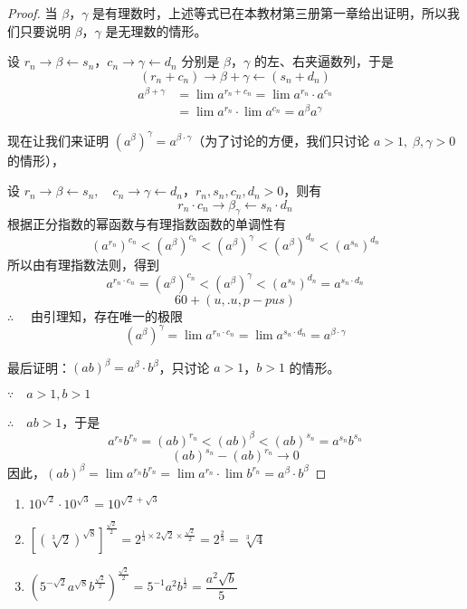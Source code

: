\begin{proof}
当 $\beta$，$\gamma$ 是有理数时，上述等式已在本教材第三册第一章给出证明，所以我们只要说明 $\beta$，$\gamma$ 是无理数的情形。

设 $r_n\to\beta\leftarrow s_n$，$c_n\to\gamma\leftarrow d_n$ 分别是 $\beta$，$\gamma$ 的左、右夹逼数列，于是
\[(r_n+c_n)\to \beta+\gamma \leftarrow (s_n+d_n)\]
\[\begin{split}
  a^{\beta+\gamma}&=\lim a^{r_n+c_n}=\lim a^{r_n}\cdot a^{c_n}\\
  &=\lim a^{r_n}\cdot \lim a^{c_n}=a^{\beta}a^{\gamma}
\end{split}\]

现在让我们来证明 $(a^{\beta})^{\gamma}=a^{\beta\cdot \gamma}$（为了讨论的方便，我们只讨论 $a>1,\; \beta ,\gamma>0$ 的情形），

设 $r_n\to \beta \leftarrow s_n,\quad c_n\to \gamma\leftarrow d_n$，$r_n, s_n,c_n,d_n>0$，则有
\[r_n\cdot c_n\to \beta_{\gamma}\leftarrow s_n\cdot d_n\]
根据正分指数的幂函数与有理指数函数的单调性有
\[(a^{r_n})^{c_n}<(a^{\beta})^{c_n}<(a^{\beta})^{\gamma}<(a^{\beta})^{d_n}<(a^{s_n})^{d_n}\]
所以由有理指数法则，得到
\[a^{r_n\cdot c_n}=(a^{\beta})^{c_n}<(a^{\beta})^{\gamma}<(a^{s_n})^{d_n}=a^{s_n\cdot d_n}\]
\[60+(u,.u,p-pus)\]
$\therefore\quad $ 由引理知，存在唯一的极限
\[(a^{\beta})^{\gamma}=\lim a^{r_n\cdot c_n} =\lim a^{s_n\cdot d_n} =a^{\beta\cdot \gamma}\]

最后证明：$(ab)^{\beta}=a^{\beta}\cdot b^{\beta}$，只讨论 $a>1$，$b>1$ 的情形。

$\because\quad a>1,b>1$

$\therefore\quad ab>1$，于是
\[a^{r_n}b^{r_n}=(ab)^{r_n}<(ab)^{\beta}<(ab)^{s_n}=a^{s_n}b^{s_n}\]
\[(ab)^{s_n}-(ab)^{r_n}\to 0\]
因此，$(ab)^{\beta}=\lim a^{r_n}b^{r_n} = \lim a^{r_n}\cdot \lim b^{r_n}=a^{\beta}\cdot b^{\beta}$
\end{proof}

\begin{example}
  \begin{enumerate}
    \item $10^{\sqrt{2}}\cdot 10^{\sqrt{3}}=10^{\sqrt{2}+\sqrt{3}}$
    \item  $\left[\left(\sqrt[3]{2}\right)^{\sqrt{8}}\right]^{\tfrac{\sqrt{2}}{2}}=2^{\tfrac{1}{3}\times 2\sqrt{2}\times\tfrac{\sqrt{2}}{2}}=2^{\tfrac{2}{3}}=\sqrt[3]{4}$
    \item $\left(5^{-\sqrt{2}}a^{\sqrt{8}}b^{\tfrac{\sqrt{2}}{2}}\right)^{\tfrac{\sqrt{2}}{2}}=5^{-1}a^{2}b^{\tfrac{1}{2}} =\dfrac{a^2\sqrt{b}}{5} $
  \end{enumerate}
\end{example}

